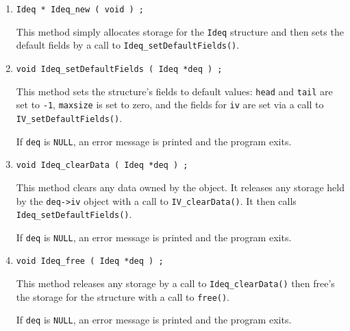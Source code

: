 \begin{enumerate}
\item
\begin{verbatim}
Ideq * Ideq_new ( void ) ;
\end{verbatim}
This method simply allocates storage for the {\tt Ideq} structure 
and then sets the default fields by a call to 
{\tt Ideq\_setDefaultFields()}.
\item
\begin{verbatim}
void Ideq_setDefaultFields ( Ideq *deq ) ;
\end{verbatim}
This method sets the structure's fields to default values:
{\tt head} and {\tt tail} are set to {\tt -1}, {\tt maxsize} is set
to zero, and the fields for {\tt iv} are set via a call to
{\tt IV\_setDefaultFields()}.
\par {}
If {\tt deq} is {\tt NULL},
an error message is printed and the program exits.
\item
\begin{verbatim}
void Ideq_clearData ( Ideq *deq ) ;
\end{verbatim}
This method clears any data owned by the object.
It releases any storage held by the {\tt deq->iv} object
with a call to {\tt IV\_clearData()}.
It then calls {\tt Ideq\_setDefaultFields()}.
\par {}
If {\tt deq} is {\tt NULL},
an error message is printed and the program exits.
\item
\begin{verbatim}
void Ideq_free ( Ideq *deq ) ;
\end{verbatim}
This method releases any storage by a call to 
{\tt Ideq\_clearData()} then free's the storage for the 
structure with a call to {\tt free()}.
\par {}
If {\tt deq} is {\tt NULL},
an error message is printed and the program exits.
\end{enumerate}
\par
